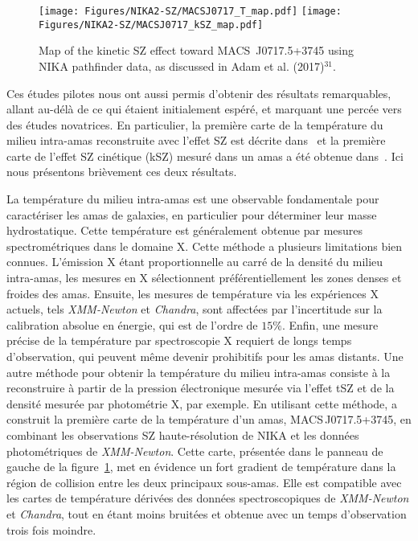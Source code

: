 %
\begin{figure}
  \centering
  \texttt{[image: Figures/NIKA2-SZ/MACSJ0717\_T\_map.pdf]}
  \texttt{[image: Figures/NIKA2-SZ/MACSJ0717\_kSZ\_map.pdf]}
  \caption{Map of the kinetic SZ effect toward \mbox{MACS~J0717.5+3745} using NIKA pathfinder data, as discussed in Adam et al. (2017)$^{31}$.}
  \label{fig:nikanika2}
\end{figure}
%
Ces études pilotes nous ont aussi permis d'obtenir des résultats
remarquables, allant au-délà de ce qui étaient initialement espéré, et
marquant une percée vers des études novatrices. En particulier,
la première carte de la température du milieu intra-amas reconstruite
avec l'effet SZ est décrite dans~\citet{Adam2017} et la première carte
de l'effet SZ cinétique (kSZ) mesuré dans un amas a été obtenue 
dans~\citet{Adam2017kSZ}. Ici nous présentons brièvement ces deux
résultats.

La température du milieu intra-amas est une observable fondamentale pour
caractériser les amas de galaxies, en particulier pour déterminer leur
masse hydrostatique. Cette température est généralement obtenue par
mesures spectrométriques dans le domaine X. Cette méthode a plusieurs
limitations bien connues. L'émission X étant proportionnelle au carré
de la densité du milieu intra-amas, les mesures en X sélectionnent
préférentiellement les zones denses et froides des amas. Ensuite, les
mesures de température via les expériences X actuels, tels
\emph{XMM-Newton} et \emph{Chandra}, sont affectées par l'incertitude
sur la calibration absolue en énergie, qui est de l'ordre de
$15\%$. Enfin, une mesure précise de la température par spectroscopie
X requiert de longs temps d'observation, qui peuvent même devenir
prohibitifs pour les amas distants. Une autre méthode pour obtenir la
température du milieu intra-amas consiste à la reconstruire à partir
de la pression électronique mesurée via l'effet tSZ et de la densité
mesurée par photométrie X, par exemple. En utilisant cette méthode,
\citet{Adam2017} a construit la première carte de la température d'un
amas, MACS\,J0717.5+3745, en combinant les observations SZ
haute-résolution de NIKA et les données photométriques de
\emph{XMM-Newton}. Cette carte, présentée dans le panneau de gauche de
la figure~\ref{fig:nikanika2}, met en évidence un fort gradient de
température dans la région de collision entre les deux principaux
sous-amas. Elle est compatible avec les cartes de température dérivées
des données spectroscopiques de \emph{XMM-Newton} et \emph{Chandra},
tout en étant moins bruitées et obtenue avec un temps d'observation
trois fois moindre.


